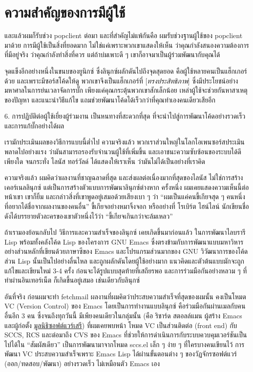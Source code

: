 \chapter{ความสำคัญของการมีผู้ใช้}

และแล้วผมก็รับช่วง popclient ต่อมา และที่สำคัญไม่แพ้กันคือ
ผมรับช่วงฐานผู้ใช้ของ popclient มาด้วย การมีผู้ใช้เป็นสิ่งที่ยอดมาก
ไม่ใช่แค่เพราะพวกเขาแสดงให้เห็น ว่าคุณกำลังสนองความต้องการที่มีอยู่จริง
ว่าคุณกำลังทำสิ่งที่ควร แต่ถ้าบ่มเพาะดี  ๆ
เขาก็อาจมาเป็นผู้ร่วมพัฒนากับคุณได้

จุดแข็งอีกอย่างหนึ่งในขนบของยูนิกซ์ ซึ่งลินุกซ์ผลักดันไปถึงจุดสุดยอด
คือผู้ใช้หลายคนเป็นแฮ็กเกอร์ด้วย และเพราะมีซอร์สโค้ดให้ดู
พวกเขาจึงเป็นแฮ็กเกอร์ที่ {[}\emph{ทรงประสิทธิภาพ}{]}
ซึ่งมีประโยชน์อย่างมหาศาลในการย่นเวลาจัดการบั๊ก
เพียงแค่คุณกระตุ้นพวกเขาสักเล็กน้อย เหล่าผู้ใช้จะช่วยกันหาสาเหตุของปัญหา
และแนะนำวิธีแก้ไข แถมช่วยพัฒนาโค้ดได้เร็วกว่าที่คุณทำเองคนเดียวเสียอีก

\begin{fancyquotes}
  6. การปฏิบัติต่อผู้ใช้เยี่ยงผู้ร่วมงาน เป็นหนทางที่สะดวกที่สุด
  ที่จะนำไปสู่การพัฒนาโค้ดอย่างรวดเร็ว และการแก้บั๊กอย่างได้ผล
\end{fancyquotes}

เรามักประเมินผลของวิธีการแบบนี้ต่ำไป ความจริงแล้ว
พวกเราส่วนใหญ่ในโลกโอเพนซอร์สประเมินพลาดไปอย่างแรง
ว่ามันสามารถรองรับจำนวนผู้ใช้ที่เพิ่มขึ้น
และเอาชนะความซับซ้อนของระบบได้ดีเพียงใด จนกระทั่ง ไลนัส ทอร์วัลด์
ได้แสดงให้เราเห็น ว่ามันไม่ได้เป็นอย่างที่เราคิด

ความจริงแล้ว ผมคิดว่าผลงานที่ชาญฉลาดที่สุด
และส่งผลต่อเนื่องมากที่สุดของไลนัส ไม่ใช่การสร้างเคอร์เนลลินุกซ์
แต่เป็นการสร้างตัวแบบการพัฒนาลินุกซ์ต่างหาก ครั้งหนึ่ง
ผมเคยแสดงความเห็นนี้ต่อหน้าเขา เขาก็ยิ้ม
และกล่าวสิ่งที่เขาพูดอยู่เสมอด้วยเสียงเบา  ๆ   ว่า ``ผมเป็นแค่คนขี้เกียจสุด  ๆ
คนหนึ่ง ที่อยากได้ชื่อจากผลงานของคนอื่น'' ขี้เกียจอย่างหมาจิ้งจอก
หรืออย่างที่ โรเบิร์ต ไฮน์ไลน์
นักเขียนชื่อดังได้บรรยายตัวละครของเขาตัวหนึ่งไว้ว่า
``ขี้เกียจเกินกว่าจะล้มเหลว''

ถ้าเรามองย้อนกลับไป วิธีการและความสำเร็จของลินุกซ์ เคยเกิดขึ้นมาก่อนแล้ว
ในการพัฒนาไลบรารี Lisp พร้อมทั้งคลังโค้ด Lisp ของโครงการ GNU Emacs
ซึ่งตรงข้ามกับการพัฒนาแบบมหาวิหารอย่างส่วนหลักที่เขียนด้วยภาษาซีของ
Emacs และโปรแกรมส่วนมากของ GNU วิวัฒนาการของโค้ดส่วน Lisp
นั้นเป็นไปอย่างลื่นไหล และถูกผลักดันโดยผู้ใช้อย่างมาก
แนวคิดและตัวต้นแบบมักจะถูกแก้ไขและเขียนใหม่ 3-4 ครั้ง
ก่อนจะได้รูปแบบสุดท้ายที่เสถียรพอ และการร่วมมือกันอย่างหลวม  ๆ
ที่ทำผ่านอินเทอร์เน็ต ก็เกิดขึ้นอยู่เสมอ เช่นเดียวกับลินุกซ์

อันที่จริง ก่อนผมจะทำ fetchmail
ผลงานที่ผมคิดว่าประสบความสำเร็จที่สุดของผมนั้น คงเป็นโหมด VC (Version
Control) ของ Emacs โดยเป็นการทำงานแบบลินุกซ์
คือร่วมมือกันผ่านเมลกับคนอื่นอีก 3 คน ซึ่งจนถึงทุกวันนี้
มีเพียงคนเดียวในกลุ่มนั้น (คือ ริชาร์ด สตอลล์แมน ผู้สร้าง Emacs
และผู้ก่อตั้ง \href{http://www.fsf.org}{มูลนิธิซอฟต์แวร์เสรี})
ที่ผมเคยพบหน้า โหมด VC เป็นส่วนติดต่อ (front end) กับ SCCS, RCS
และต่อมาถึง CVS ของ Emacs
ที่ช่วยให้การดำเนินการกับระบบควบคุมเวอร์ชันเป็นไปได้ใน ``สัมผัสเดียว''
เป็นการพัฒนามาจากโหมด sccs.el เล็ก  ๆ   ง่าย  ๆ   ที่ใครบางคนเขียนไว้ การพัฒนา
VC ประสบความสำเร็จเพราะ Emacs Lisp ได้ผ่านขั้นตอนต่าง  ๆ
ของวัฏจักรซอฟต์แวร์ (ออก/ทดสอบ/พัฒนา) อย่างรวดเร็ว ไม่เหมือนตัว Emacs
เอง

